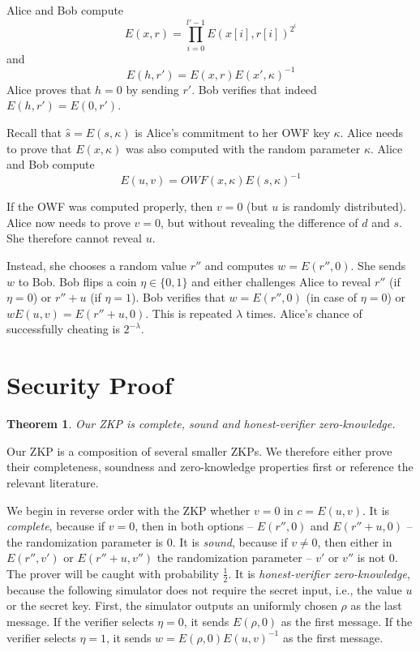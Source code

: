 \documentclass{llncs}
\newtheorem{thm}{Theorem}
\begin{document}
Alice and Bob compute
$$
E(x, r) = \prod_{i = 0}^{l'-1} E(x[i], r[i])^{2^{i}}
$$
and
$$
E(h, r') = E(x, r) E(x', \kappa)^{-1}
$$
Alice proves that $h = 0$ by sending $r'$.
Bob verifies that indeed $E(h, r') = E(0, r')$.

Recall that $\hat{s} = E(s, \kappa)$ is Alice's commitment to her OWF key $\kappa$.
Alice needs to prove that $E(x, \kappa)$ was also computed with the random parameter $\kappa$.
Alice and Bob compute
$$
E(u, v) = OWF(x, \kappa) E(s, \kappa)^{-1}
$$

If the OWF was computed properly, then $v = 0$ (but $u$ is randomly distributed).
Alice now needs to prove $v = 0$, but without revealing the difference of $d$ and $s$.
She therefore cannot reveal $u$.

Instead, she chooses a random value $r''$ and computes $w = E(r'', 0)$.
She sends $w$ to Bob.
Bob flips a coin $\eta \in \{ 0, 1 \}$ and either challenges Alice to reveal $r''$ (if $\eta = 0$) or $r'' + u$ (if $\eta = 1$).
Bob verifies that $w = E(r'', 0)$ (in case of $\eta = 0$) or $w E(u, v) = E(r'' + u, 0)$.
This is repeated $\lambda$ times.
Alice's chance of successfully cheating is $2^{-\lambda}$.

\section{Security Proof}
\label{sec:proof}

\begin{thm}
Our ZKP is complete, sound and honest-verifier zero-knowledge.
\end{thm}

Our ZKP is a composition of several smaller ZKPs.
We therefore either prove their completeness, soundness and zero-knowledge properties first or reference the relevant literature.

We begin in reverse order with the ZKP whether $v = 0$ in $c = E(u, v)$.
It is {\em complete}, because if $v = 0$, then in both options -- $E(r'', 0)$ and $E(r'' + u, 0)$ -- the randomization parameter is $0$.
It is {\em sound}, because if $v \neq 0$, then either in $E(r'', v')$ or $E(r'' + u, v'')$ the randomization parameter -- $v'$ or $v''$ is not $0$.
The prover will be caught with probability $\frac{1}{2}$.
It is {\em honest-verifier zero-knowledge}, because the following simulator does not require the secret input, i.e., the value $u$ or the secret key.
First, the simulator outputs an uniformly chosen $\rho$ as the last message.
If the verifier selects $\eta = 0$, it sends $E(\rho, 0)$ as the first message.
If the verifier selects $\eta = 1$, it sends $w = E(\rho, 0) E(u, v)^{-1}$ as the first message.
\end{document}
